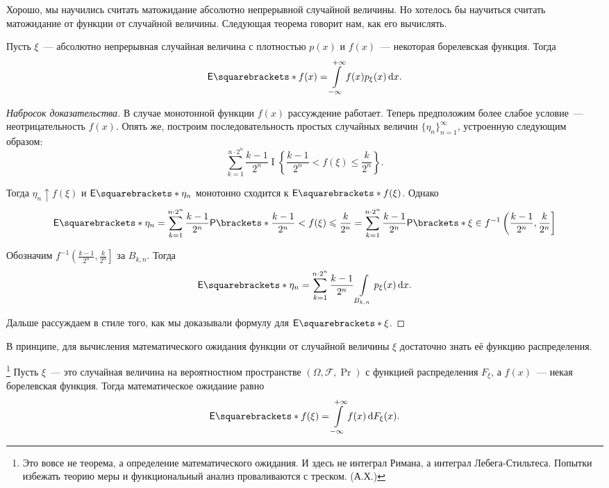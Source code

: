 Хорошо, мы научились считать матожидание абсолютно непрерывной случайной величины. Но хотелось бы научиться считать матожидание от функции от случайной величины. Следующая теорема говорит нам, как его вычислять.
\begin{theorem}
	Пусть \(\xi\)~--- абсолютно непрерывная случайная величина с плотностью \(p(x)\) и \(f(x)\)~--- некоторая борелевская функция. Тогда
	\[
	\E{f(x)} = \int\limits_{-\infty}^{+\infty} f(x)p_{\xi}(x)\,\mathrm{d}x.
	\]
\end{theorem}
\begin{proof}[Набросок доказательства]
	В случае монотонной функции \(f(x)\) рассуждение работает. Теперь предположим более слабое условие~--- неотрицательность \(f(x)\). Опять же, построим последовательность простых случайных величин \(\{\eta_n\}_{n = 1}^{\infty}\), устроенную следующим образом:
	\[
	\sum\limits_{k = 1}^{n \cdot 2^n} \frac{k - 1}{2^n}\mathop{I}\left\{\frac{k - 1}{2^n} < f(\xi) \leq \frac{k}{2^n}\right\}.
	\]
	
	Тогда \(\eta_n \uparrow f(\xi)\) и \(\E{\eta_n}\) монотонно сходится к \(\E{f(\xi)}\). Однако
	\[
	\E{\eta_n} = \sum\limits_{k = 1}^{n \cdot 2^n} \frac{k - 1}{2^n}\Pr{\frac{k - 1}{2^n} < f(\xi) \leq \frac{k}{2^n}} = \sum\limits_{k = 1}^{n \cdot 2^n} \frac{k - 1}{2^n}\Pr{\xi \in f^{-1}\left(\frac{k - 1}{2^n}, \frac{k}{2^n}\right]}
	\]
	
	Обозначим \(f^{-1}\left(\frac{k - 1}{2^n}, \frac{k}{2^n}\right]\) за \(B_{k, n}\). Тогда
	\[
	\E{\eta_n} = \sum\limits_{k = 1}^{n \cdot 2^n} \frac{k - 1}{2^n} \int\limits_{B_{k, n}}p_{\xi}(x)\,\mathrm{d}x.
	\]
	
	Дальше рассуждаем в стиле того, как мы доказывали формулу для \(\E{\xi}\).
\end{proof}

В принципе, для вычисления математического ожидания функции от случайной величины \(\xi\) достаточно знать её функцию распределения.
\begin{theorem}\footnote{Это вовсе не теорема, а определение математического ожидания. И здесь не интеграл Римана, а интеграл Лебега-Стильтеса. Попытки избежать теорию меры и функциональный анализ проваливаются с треском. (А.Х.)}
	Пусть \(\xi\)~--- это случайная величина на вероятностном пространстве \((\Omega, \mathcal{F}, \Pr)\) с функцией распределения \(F_{\xi}\), а \(f(x)\)~--- некая борелевская функция. Тогда математическое ожидание равно
	\[\E{f(\xi)} = \int\limits_{-\infty}^{+\infty} f(x)\,\mathrm{d}F_{\xi}(x).\]
\end{theorem}

